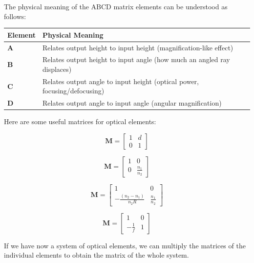 \documentclass[
  a4paper,
]{book}
\begin{document}
\begin{tcolorbox}
The physical meaning of the ABCD matrix elements can be understood as
follows:

\begin{longtable}[]{@{}
  >{\raggedright\arraybackslash}p{}
  >{\raggedright\arraybackslash}p{}@{}}
\toprule\noalign{}
\begin{minipage}[b]{\linewidth}\raggedright
Element
\end{minipage} & \begin{minipage}[b]{\linewidth}\raggedright
Physical Meaning
\end{minipage} \\
\midrule\noalign{}
\endhead
\bottomrule\noalign{}
\endlastfoot
\textbf{A} & Relates output height to input height (magnification-like
effect) \\
\textbf{B} & Relates output height to input angle (how much an angled
ray displaces) \\
\textbf{C} & Relates output angle to input height (optical power,
focusing/defocusing) \\
\textbf{D} & Relates output angle to input angle (angular
magnification) \\
\end{longtable}

Here are some useful matrices for optical elements:

\[
\mathbf{M}=\left[\begin{array}{ll}
1 & d \\
0 & 1
\end{array}\right] \tag{Free space}
\]

\[
\mathbf{M}=\left[\begin{array}{cc}
1 & 0 \\
0 & \frac{n_1}{n_2}
\end{array}\right] \tag{Planar interface}
\]

\[
\mathbf{M}=\left[\begin{array}{cc}
1 & 0 \\
-\frac{\left(n_2-n_1\right)}{n_2 R} & \frac{n_1}{n_2}
\end{array}\right] \tag{Spherical Boundary}
\]

\[
\mathbf{M}=\left[\begin{array}{cc}
1 & 0 \\
-\frac{1}{f} & 1
\end{array}\right] \tag{Tin Lens}
\]

If we have now a system of optical elements, we can multiply the
matrices of the individual elements to obtain the matrix of the whole
system.


\end{tcolorbox}
\end{document}
